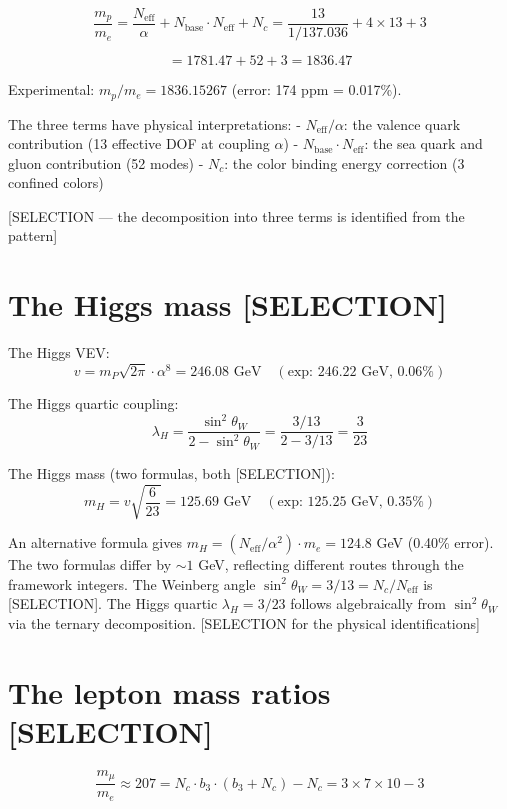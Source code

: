 \documentclass[
  11pt,
  letterpaper,
  twoside,
  openany]{book}
\makeatletter
\let\orig@section\section
\renewcommand{\section}{\needspace{8\baselineskip}\orig@section}
\makeatother
\begin{document}
\[
\frac{m_p}{m_e} = \frac{N_{\text{eff}}}{\alpha} + N_{\text{base}} \cdot N_{\text{eff}} + N_c = \frac{13}{1/137.036} + 4 \times 13 + 3
\tag{12.2}
\]

\[
= 1781.47 + 52 + 3 = 1836.47
\]

Experimental: \(m_p/m_e = 1836.15267\) (error: 174 ppm = 0.017\%).

The three terms have physical interpretations: -
\(N_{\text{eff}}/\alpha\): the valence quark contribution (13 effective
DOF at coupling \(\alpha\)) - \(N_{\text{base}} \cdot N_{\text{eff}}\):
the sea quark and gluon contribution (52 modes) - \(N_c\): the color
binding energy correction (3 confined colors)

{[}SELECTION --- the decomposition into three terms is identified from
the pattern{]}

\section{The Higgs mass {[}SELECTION{]}}\label{the-higgs-mass-selection}

The Higgs VEV: \[
v = m_P \sqrt{2\pi} \cdot \alpha^8 = 246.08 \text{ GeV} \quad (\text{exp: } 246.22 \text{ GeV, 0.06\%})
\tag{12.3}
\]

The Higgs quartic coupling: \[
\lambda_H = \frac{\sin^2\theta_W}{2 - \sin^2\theta_W} = \frac{3/13}{2 - 3/13} = \frac{3}{23}
\tag{12.4}
\]

The Higgs mass (two formulas, both {[}SELECTION{]}): \[
m_H = v\sqrt{\frac{6}{23}} = 125.69 \text{ GeV} \quad (\text{exp: } 125.25 \text{ GeV, 0.35\%})
\tag{12.5}
\]

An alternative formula gives
\(m_H = (N_{\text{eff}}/\alpha^2) \cdot m_e = 124.8\) GeV (0.40\%
error). The two formulas differ by \(\sim 1\) GeV, reflecting different
routes through the framework integers. The Weinberg angle
\(\sin^2\theta_W = 3/13 = N_c/N_{\text{eff}}\) is {[}SELECTION{]}. The
Higgs quartic \(\lambda_H = 3/23\) follows algebraically from
\(\sin^2\theta_W\) via the ternary decomposition. {[}SELECTION for the
physical identifications{]}

\section{The lepton mass ratios
{[}SELECTION{]}}\label{the-lepton-mass-ratios-selection}

\[
\frac{m_\mu}{m_e} \approx 207 = N_c \cdot b_3 \cdot (b_3 + N_c) - N_c = 3 \times 7 \times 10 - 3
\]
\end{document}
